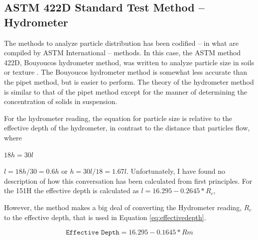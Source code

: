 \documentclass{tufte-handout}
\begin{document}


\subsection{ASTM 422D Standard Test Method -- Hydrometer}

The methods to analyze particle distribution has been codified -- in what are compiled by ASTM International -- methods. In this case, the ASTM method 422D, Bouyoucos hydrometer method, was written to analyze particle size in soils or texture \citep{standard2007d422}. The Bouyoucos hydrometer method is somewhat less accurate than the pipet method, but is easier to perform.  The theory of the hydrometer method is similar to that of the pipet method except for the manner of determining the concentration of solids in suspension.  

For the hydrometer reading, the equation for particle size is relative to the effective depth of the hydrometer, in contrast to the distance that particles flow, where

$18 h = 30 l$

$l = 18h/30 = 0.6h$ or $h = 30l/18 = 1.67l$. Unfortunately, I have found no description of how this conversation has been calculated from first principles. For the 151H the effective depth is calculated as $l = 16.295 - 0.2645* R_c$,

However, the method makes a big deal of converting the Hydrometer reading, $R_c$ to the effective depth, that is used in Equation \ref{eq:effectivedepth}.

\begin{equation}\label{eq:effectivedepth}
\texttt{Effective Depth} = 16.295 - 0.1645*Rm
\end{equation}
\end{document}
